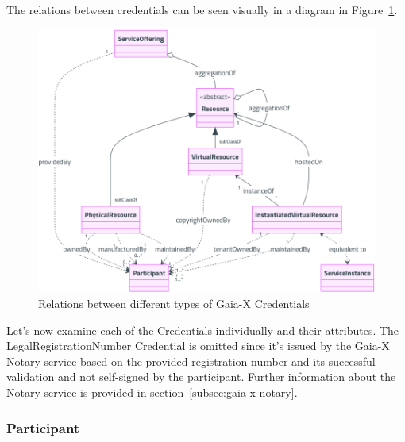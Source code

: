 The relations between credentials can be seen visually in a diagram in Figure~\ref{fig:credential_relations}.

\begin{figure}
    \centering
    \includegraphics[width=\textwidth]{figures/credential-relations.png}
    \caption{Relations between different types of Gaia-X Credentials~\cite{gaiax_architecture_document}}\label{fig:credential_relations}
\end{figure}

Let's now examine each of the Credentials individually and their attributes.
The LegalRegistrationNumber Credential is omitted since it's issued by the Gaia-X Notary service based on the provided registration number and its successful validation and not self-signed by the participant.
Further information about the Notary service is provided in section~\ref{subsec:gaia-x-notary}.

\subsubsection{Participant}

